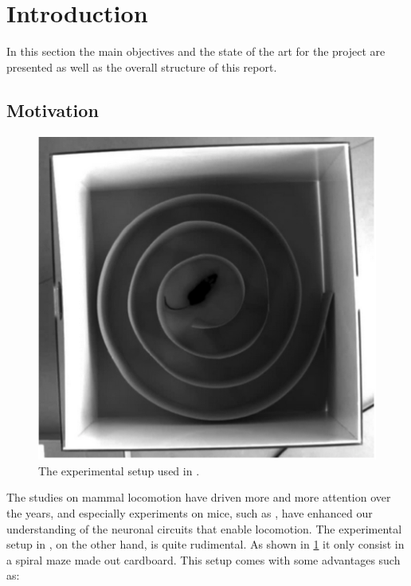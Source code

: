 \documentclass[12pt,a4paper, twoside]{article}
\begin{document}

\pagestyle{plain}
\clearpage

\tableofcontents
\clearpage
\pagestyle{fancy}
\section{Introduction}\label{sec:intro}
In this section the main objectives and the state of the art for the project are presented as well as the overall structure of this report.
\subsection{Motivation}
\begin{figure}
	\includegraphics[width=\linewidth]{fig/OleSetup.png}
	\caption{The experimental setup used in \cite{Ole}.}\label{fig:OleSetup}
	\vspace{-2 cm}
\end{figure}
The studies on mammal locomotion have driven more and more attention over the years, and especially experiments on mice, such as \cite{Ole}, have enhanced our understanding of the neuronal circuits that enable locomotion. The experimental setup in \cite{Ole}, on the other hand, is quite rudimental. As shown in \ref{fig:OleSetup} it only consist in a spiral maze made out cardboard. This setup comes with some advantages such as:
\end{document}
